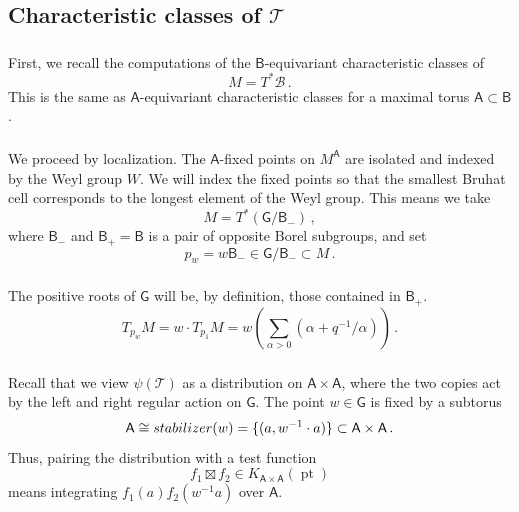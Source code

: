 \documentclass[14pt]{extarticle}
\newcommand{\Ct}{\mathbb{C}^\times}
\newcommand{\bT}{\mathsf{T}}
\newcommand{\bA}{\mathsf{A}}
\newcommand{\bG}{\mathsf{G}}
\newcommand{\bB}{\mathsf{B}}
\newcommand{\cT}{\mathscr{T}}
\newcommand{\cB}{\mathscr{B}}
\newcommand{\hb}{q}
\newcommand{\Tau}{\mathscr{T}}
\DeclareMathOperator{\pt}{pt}
\theoremstyle{definition}
\begin{document}
\subsection{Characteristic classes of $\Tau$}\label{s_charT} 

\subsubsection{}

First, we recall the computations of
the $\bB$-equivariant characteristic classes of
\[
  M=T^*\cB \,. 
\]
This is the same as $\bA$-equivariant characteristic
classes for a maximal torus $\bA\subset \bB$.

\subsubsection{}

We proceed by localization. The $\bA$-fixed points on $M^\bA$ are
isolated and indexed by the Weyl group $W$. We will index the fixed points so that the smallest
Bruhat cell corresponds to the longest element of the Weyl group. This
means we take
%
\begin{equation}
M = T^*(\bG / \bB_{-}) \,, \label{eq:76}
\end{equation}
%
where $\bB_{-}$ and $\bB_{+}=\bB$ is a pair of opposite Borel subgroups, and set
\[
  p_w = w \bB_{-}  \in \bG / \bB_{-} \subset M \,.
\]


\subsubsection{}

The positive roots of $\bG$ will be, by definition, those contained in
$\bB_+$. 
\[
  T_{p_w} M = w \cdot T_{p_1} M = w \left( \sum_{\alpha > 0}  (\alpha + q^{-1} / \alpha)
\right) \,. 
\]


\subsubsection{}\label{s_f1f2}

Recall that we view $\psi(\cT)$ as a distribution on $\bA \times \bA$,
where the two copies act by the left and right regular action on
$\bG$. The point $w\in \bG$ is fixed by a subtorus
\[
  \bA \cong \textup{stabilizer}(w) = \{(a,w^{-1} \cdot a)\} \subset
\bA \times \bA \,.
\]
Thus, pairing the distribution with a test function
\[
  f_1 \boxtimes f_2 \in K_{\bA \times \bA}(\pt)
\]
means integrating $f_1(a) f_2(w^{-1} a)$ over $\bA$.
\end{document}

